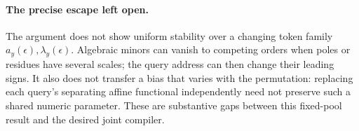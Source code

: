 \documentclass[11pt]{article}
\begin{document}
\paragraph{The precise escape left open.}
The argument does not show uniform stability over a changing token
family $a_y(\epsilon),\lambda_y(\epsilon)$. Algebraic minors can
vanish to competing orders when poles or residues have several scales;
the query address can then change their leading signs. It also does
not transfer a bias that varies with the permutation: replacing each
query's separating affine functional independently need not preserve
such a shared numeric parameter. These are substantive gaps between
this fixed-pool result and the desired joint compiler.
\end{document}
